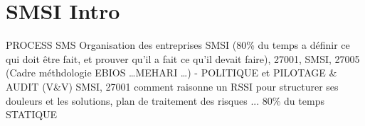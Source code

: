 \section{SMSI Intro}
PROCESS SMS Organisation des entreprises SMSI (80\% du temps a définir ce qui doit être fait, et prouver qu'il a fait ce qu'il devait faire), 27001, SMSI, 27005 (Cadre méthdologie EBIOS …MEHARI …) - POLITIQUE et PILOTAGE \& AUDIT (V\&V) SMSI, 27001 comment raisonne un RSSI pour structurer ses douleurs et les solutions, plan de traitement des risques ... 80\% du temps STATIQUE




